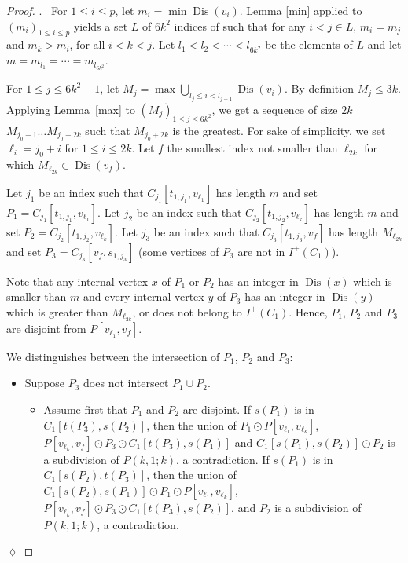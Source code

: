 \documentclass[utf8,10pt]{article}
\theoremstyle{plain}
\theoremstyle{definition}
\theoremstyle{remark}
\newenvironment{subproof}{\par\noindent {\it Subproof}.\ }{\hfill$\lozenge$\par\vspace{11pt}}
\DeclareMathOperator{\Dis}{Dis}
\begin{document}
\begin{proof}
\begin{subproof}
For $1\leq i\leq p$, let $m_i = \min \Dis(v_i)$. 
Lemma \ref{min} applied to $(m_i)_{1\leq i\leq p}$ yields a set $L$ of $6k^2$ indices of such that 
for any $i< j \in L$,  $m_i=m_j$ and $m_k > m_i$, for all $i< k < j$.
Let $l_1 < l_2 < \cdots < l_{6k^2}$ be the elements of $L$ and let $m= m_{l_1} = \cdots = m_{l_{6k^2}}$.


For $1\leq j\leq 6k^2-1$, let $M_j = \max \bigcup_{l_j\leq i < l_{j+1}} \Dis(v_i)$.
By definition $M_j\leq 3k$.
Applying Lemma~\ref{max} to $(M_j)_{1\leq j\leq 6k^2}$,  we get a sequence of size $2k$ $M_{j_0+1} \dots M_{j_0+{2k}}$ such that $M_{j_0+{2k}}$ is the greatest. For sake of simplicity, we set $\ell_i =j_0+i$ for $1\leq i\leq 2k$.
Let $f$ the smallest index not smaller than $\ell_{2k}$ for which $M_{\ell_{2k}} \in \Dis (v_f)$. 

Let $j_1$ be an index such that $C_{j_1}[t_{1,j_1},v_{\ell_1}]$ has length $m$ and set $P_1=C_{j_1}[t_{1,j_1},v_{\ell_1}]$.
Let $j_2$ be an index such that $C_{j_2}[t_{1,j_2},v_{\ell_k}]$ has length $m$ and set $P_2=C_{j_2}[t_{1,j_2},v_{\ell_k}]$.
Let $j_3$ be an index such that  $C_{j_3}[t_{1,j_3},v_{f}]$ has length $M_{\ell_{2k}}$ and set $P_3=C_{j_3}[v_f, s_{1,j_3}]$ (some vertices of $P_3$ are not in $I^+(C_1)$).

Note that any internal vertex $x$ of $P_1$ or $P_2$ has an integer in $\Dis(x)$
which is smaller than $m$ and every internal vertex $y$ of $P_3$ has an integer in $\Dis(y)$ which
is greater than $M_{\ell_{2k}}$, or does not belong to $I^+(C_1)$. Hence, 
$P_1$, $P_2$ and $P_3$ are disjoint from $P[v_{\ell_1},v_f]$. 


We distinguishes between the intersection of $P_1$, $P_2$ and $P_3$:

\begin{itemize}
	\item Suppose $P_3$ does not intersect $P_1 \cup P_2$.
	\begin{itemize}
		\item Assume first that $P_1$ and $P_2$ are disjoint. If $s(P_1)$ is in $C_1[t(P_3), s(P_2)]$, then the union of  $P_1 \odot P[v_{\ell_1}, v_{\ell_k}]$, $P[v_{\ell_k}, v_f] \odot P_3\odot C_1[t(P_3), s(P_1)]$ and $C_1[s(P_1), s(P_2)]\odot P_2$ is a subdivision of $P(k,1;k)$, a contradiction.
		 If $s(P_1)$ is in $C_1[ s(P_2), t(P_3)]$, then the union of  $C_1[s(P_2), s(P_1)]\odot P_1\odot P[v_{\ell_1}, v_{\ell_k}]$, $P[v_{\ell_k}, v_f]\odot  P_3\odot C_1[t(P_3), s(P_2)]$, and  $P_2$ is a subdivision of $P(k,1;k)$, a contradiction.
	

\end{itemize}
\end{itemize}
\end{subproof}
\end{proof}
\end{document}
